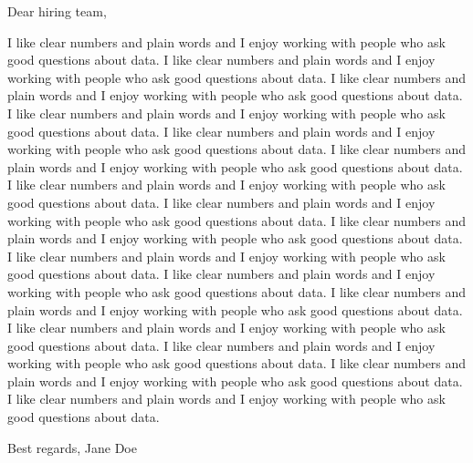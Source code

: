 \documentclass{article}
\begin{document}
Dear hiring team,

I like clear numbers and plain words and I enjoy working with people who ask good questions about data. I like clear numbers and plain words and I enjoy working with people who ask good questions about data. I like clear numbers and plain words and I enjoy working with people who ask good questions about data. I like clear numbers and plain words and I enjoy working with people who ask good questions about data. I like clear numbers and plain words and I enjoy working with people who ask good questions about data. I like clear numbers and plain words and I enjoy working with people who ask good questions about data. I like clear numbers and plain words and I enjoy working with people who ask good questions about data. I like clear numbers and plain words and I enjoy working with people who ask good questions about data. I like clear numbers and plain words and I enjoy working with people who ask good questions about data. I like clear numbers and plain words and I enjoy working with people who ask good questions about data. I like clear numbers and plain words and I enjoy working with people who ask good questions about data. I like clear numbers and plain words and I enjoy working with people who ask good questions about data. I like clear numbers and plain words and I enjoy working with people who ask good questions about data. I like clear numbers and plain words and I enjoy working with people who ask good questions about data. I like clear numbers and plain words and I enjoy working with people who ask good questions about data. I like clear numbers and plain words and I enjoy working with people who ask good questions about data.

Best regards, Jane Doe
\end{document}
